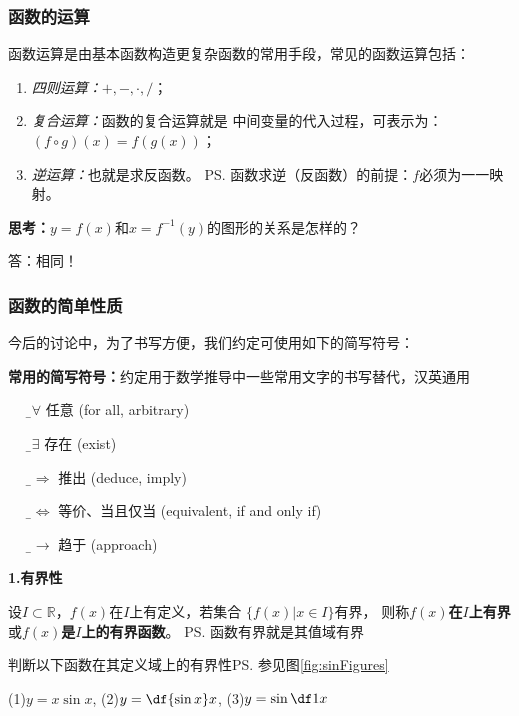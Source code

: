 \subsubsection{函数的运算}

函数运算是由基本函数构造更复杂函数的常用手段，常见的函数运算包括：
\begin{enumerate}
  \setlength{\itemindent}{1cm}
  \item {\it 四则运算：}$+,-,\cdot,/$；
  \item {\it 复合运算：}函数的复合运算就是
  中间变量的代入过程，可表示为：$(f\circ g)(x)=f(g(x))$；
  \item {\it 逆运算：}也就是求反函数。
  \ps{函数求逆（反函数）的前提：$f$必须为一一映射}。
\end{enumerate}

\bs
{\bf 思考：}$y=f(x)$和$x=f^{-1}(y)$的图形的关系是怎样的？

\ifhint
答：相同！
\fi

\subsubsection{函数的简单性质}

今后的讨论中，为了书写方便，我们约定可使用如下的简写符号：
\begin{tcolorbox}[colback=white!90!black]
	{\bf 常用的简写符号：}约定用于数学推导中一些常用文字的书写替代，汉英通用
	\begin{itemize}
	  \item[{\b$\bm{\forall}$}]  \quad 任意 (for all, arbitrary)
	  \item[{\b$\bm{\exists}$}] \quad 存在 (exist)
	  \item[{\b$\bm{\Rightarrow}$}] \quad 推出 (deduce, imply)
	  \item[{\b$\bm{\Leftrightarrow}$}] \quad 等价、当且仅当 (equivalent, if and only if)
	  \item[{\b$\bm{\to}$}] \quad 趋于 (approach)
	\end{itemize}
\end{tcolorbox}

{\bf 1.有界性}

设$I\subset\mathbb{R}$，$f(x)$在$I$上有定义，若集合
$\{f(x)|x\in I\}$有界，
则称{\bf $f(x)$在$I$上有界}或{\bf $f(x)$是$I$上的有界函数}。
\ps{函数有界就是其值域有界}

\bs
\egz 判断以下函数在其定义域上的有界性\ps{参见图\ref{fig:sinFigures}}

\quad(1)\;$y=x\sin x$,\hspace{5em} (2)\;$y=\df{\sin x}x$,
\hspace{5em} (3)\;$y=\sin\df1x$

